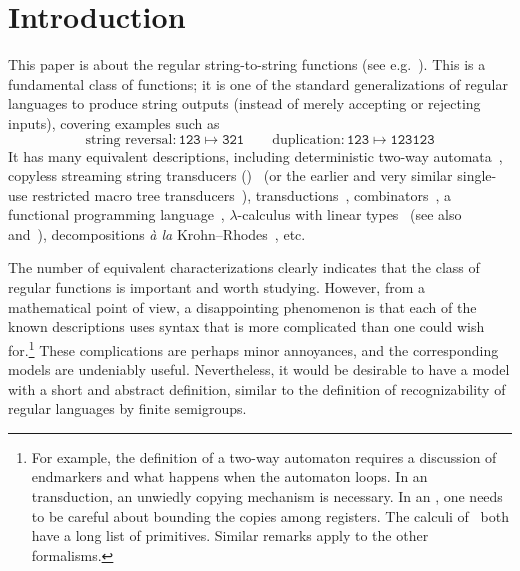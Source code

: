 \section{Introduction}
\label{sec:intro}

This paper is about the regular string-to-string functions (see e.g.~\cite{MuschollPuppis}). This is a
fundamental class of functions; it is one of the standard generalizations of regular languages to produce string
outputs (instead of merely accepting or rejecting inputs), covering examples such as
\[ \text{string reversal}\colon \mathtt{123 \mapsto 321} \qquad \text{duplication}\colon \mathtt{123 \mapsto 123123}\]
It has many equivalent descriptions, including deterministic two-way automata~\cite[Note~4]{shepherdson1959reduction}, copyless streaming string transducers (\sst)~\cite[Section~3]{alurExpressivenessStreamingString2010} (or the earlier and very similar single-use restricted macro tree transducers~\cite[Section~5]{MacroMSO}), \mso transductions~\cite[Theorem~13]{engelfrietMSODefinableString2001}, combinators~\cite[Section~2]{alur2014regular}, a functional programming language~\cite[Section~6]{bojanczykRegularFirstOrderList2018}, $\lambda$-calculus with linear types~\cite[Theorem~3]{LambdaTransducer} (see also~\cite[Claim~6.2]{IATLC} and~\cite[Theorem~1.2.3]{titoPhD}), decompositions \textit{à la} Krohn--Rhodes~\cite[Theorem~18, item~4]{bojanczykstefanski2020}, etc.

The number of equivalent characterizations clearly indicates that
the class of regular functions is important and worth studying. However, from a mathematical point of view, a disappointing phenomenon is that each of the known descriptions uses syntax that is more complicated than one could wish for.\footnote{For example, the definition of a two-way automaton requires a discussion of endmarkers and what happens when the automaton loops. In an \mso transduction, an unwiedly copying mechanism is necessary. In an \sst, one needs to be careful about bounding the copies among registers.
The calculi of~\cite{alur2014regular,bojanczykRegularFirstOrderList2018} both have a long list of primitives.
Similar remarks apply to the other formalisms.}
These complications are perhaps minor annoyances, and the corresponding models are undeniably useful. Nevertheless, it would be desirable to have a model with a short and abstract definition, similar to the definition of recognizability of regular languages by finite semigroups. %


